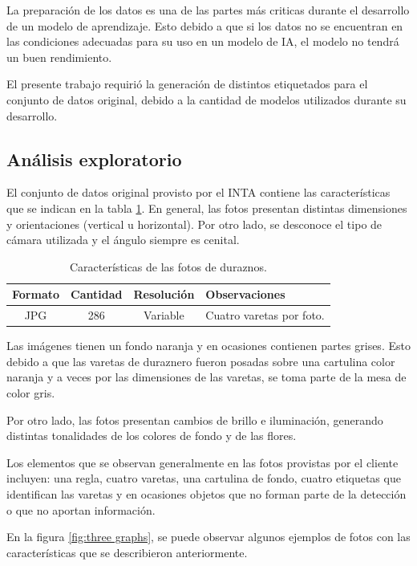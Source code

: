 La preparación de los datos es una de las partes más criticas durante el desarrollo de un modelo de aprendizaje. Esto debido a que si los datos no se encuentran en las condiciones adecuadas para su uso en un modelo de IA, el modelo no tendrá un buen rendimiento. 

El presente trabajo requirió la generación de distintos etiquetados para el conjunto de datos original, debido a la cantidad de modelos utilizados durante su desarrollo.

\subsection{Análisis exploratorio}
\label{section3.2.1}
El conjunto de datos original provisto por el INTA contiene las características que se indican en la tabla \ref{tab:flores}. En general, las fotos presentan distintas dimensiones y orientaciones (vertical u horizontal). Por otro lado, se desconoce el tipo de cámara utilizada y el ángulo siempre es cenital.


\begin{table}[h]
	\centering
	\caption{Características de las fotos de duraznos.}
	\begin{tabular}{c c c l}    
		\toprule
		\textbf{Formato}     & \textbf{Cantidad} & \textbf{Resolución} & \textbf{Observaciones}\\
		\midrule
		JPG                  & 286               &  Variable &  Cuatro varetas por foto.\\		
		\bottomrule
		\hline
	\end{tabular}
	\label{tab:flores}
\end{table}
 
Las imágenes tienen un fondo naranja y en ocasiones contienen partes grises. Esto debido a que las varetas de duraznero fueron posadas sobre una cartulina color naranja y a veces por las dimensiones de las varetas, se toma parte de la mesa de color gris.

Por otro lado, las fotos presentan cambios de brillo e iluminación, generando distintas tonalidades de los colores de fondo y de las flores. 

Los elementos que se observan generalmente en las fotos provistas por el cliente incluyen: una regla, cuatro varetas, una cartulina de fondo, cuatro etiquetas que identifican las varetas y en ocasiones objetos que no forman parte de la detección o que no aportan información.

En la figura \ref{fig:three graphs}, se puede observar algunos ejemplos de fotos con las características que se describieron anteriormente.


